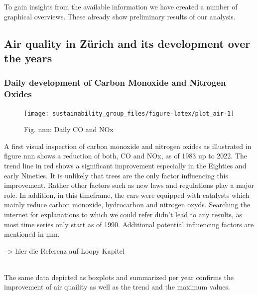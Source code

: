 \documentclass[
]{article}
\begin{document}
\hfill\break

To gain insights from the available information we have created a number
of graphical overviews. These already show preliminary results of our
analysis.

\hfill\break

\hypertarget{air-quality-in-zuxfcrich-and-its-development-over-the-years}{%
\subsection{Air quality in Zürich and its development over the
years}\label{air-quality-in-zuxfcrich-and-its-development-over-the-years}}

\hfill\break

\hypertarget{daily-development-of-carbon-monoxide-and-nitrogen-oxides}{%
\subsubsection{Daily development of Carbon Monoxide and Nitrogen
Oxides}\label{daily-development-of-carbon-monoxide-and-nitrogen-oxides}}

\begin{figure}

{\centering \texttt{[image: sustainability\_group\_files/figure-latex/plot\_air-1]} 

}

\caption{Fig. nnn: Daily CO and NOx}\label{fig:plot_air}
\end{figure}

A first visual inspection of carbon monoxide and nitrogen oxides as
illustrated in figure nnn shows a reduction of both, CO and NOx, as of
1983 up to 2022. The trend line in red shows a significant improvement
especially in the Eighties and early Nineties. It is unlikely that trees
are the only factor influencing this improvement. Rather other factors
such as new laws and regulations play a major role. In addition, in this
timeframe, the cars were equipped with catalysts which mainly reduce
carbon monoxide, hydrocarbon and nitrogen oxyds. Searching the internet
for explanations to which we could refer didn't lead to any results, as
most time series only start as of 1990. Additional potential influencing
factors are mentioned in nnn.

\hfill\break
\hfill\break
--\textgreater{} hier die Referenz auf Loopy Kapitel\\
\strut \\

The same data depicted as boxplots and summarized per year confirms the
improvement of air quaility as well as the trend and the maximum values.
\end{document}
